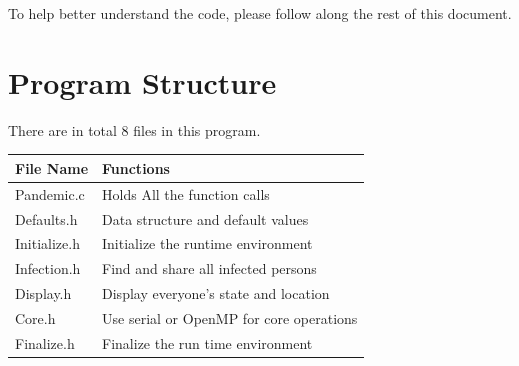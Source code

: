 \documentclass[letterpaper,10pt,openany,oneside]{sphinxmanual}
\begin{document}
To help better understand the code, please follow along the rest of this document.


\chapter{Program Structure}
\label{1-ProgramStructure/programstructure:program-structure}\label{1-ProgramStructure/programstructure::doc}

There are in total 8 files in this program.

\begin{tabulary}{\linewidth}{|L|L|}
\hline
\textbf{
File Name
} & \textbf{
Functions
}\\\hline

Pandemic.c
 & 
Holds All the function calls
\\\hline

Defaults.h
 & 
Data structure and default values
\\\hline

Initialize.h
 & 
Initialize the runtime environment
\\\hline

Infection.h
 & 
Find and share all infected persons
\\\hline

Display.h
 & 
Display everyone's state and location
\\\hline

Core.h
 & 
Use serial or OpenMP for core operations
\\\hline

Finalize.h
 & 
Finalize the run time environment
\\\hline
\end{tabulary}
\end{document}
